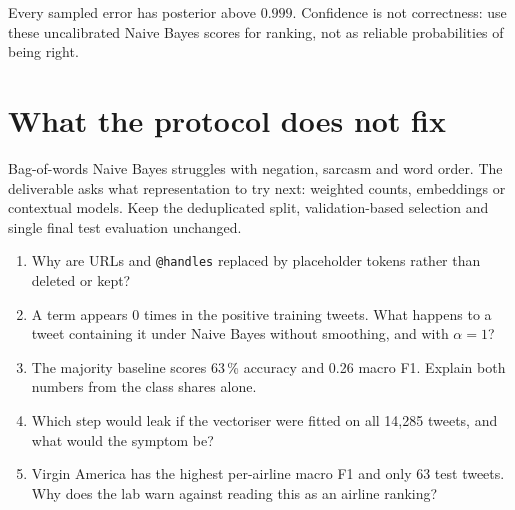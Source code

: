 \begin{pitfall}
Every sampled error has posterior above $0.999$. Confidence is not correctness: use these uncalibrated Naive Bayes scores for ranking, not as reliable probabilities of being right.
\end{pitfall}

\section{What the protocol does not fix}

Bag-of-words Naive Bayes struggles with negation, sarcasm and word order. The deliverable asks what representation to try next: weighted counts, embeddings or contextual models. Keep the deduplicated split, validation-based selection and single final test evaluation unchanged.



\begin{quickcheck}
\begin{enumerate}
  \item Why are URLs and \texttt{@handles} replaced by placeholder tokens rather than deleted or kept?
  \item A term appears 0 times in the positive training tweets. What happens to a tweet containing it under Naive Bayes without smoothing, and with $\alpha=1$?
  \item The majority baseline scores 63\,\% accuracy and 0.26 macro F1. Explain both numbers from the class shares alone.
  \item Which step would leak if the vectoriser were fitted on all 14,285 tweets, and what would the symptom be?
  \item Virgin America has the highest per-airline macro F1 and only 63 test tweets. Why does the lab warn against reading this as an airline ranking?
\end{enumerate}
\end{quickcheck}
